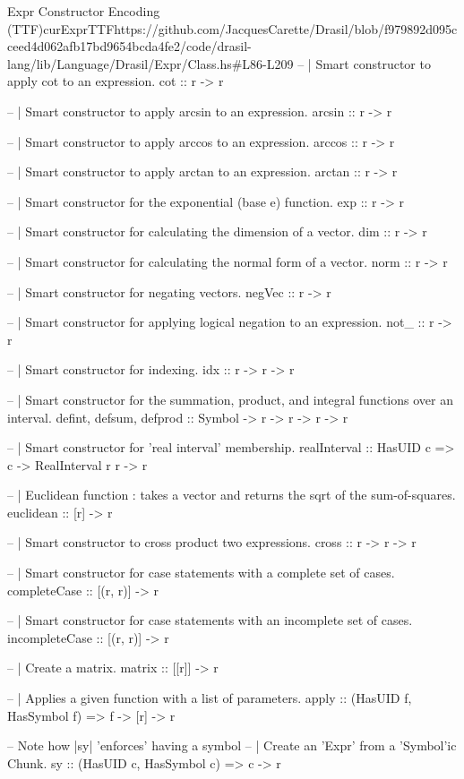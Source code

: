 \begin{haskell}{Expr Constructor Encoding (TTF)}{curExprTTF}{https://github.com/JacquesCarette/Drasil/blob/f979892d095cceed4d062afb17bd9654bcda4fe2/code/drasil-lang/lib/Language/Drasil/Expr/Class.hs\#L86-L209}
  -- | Smart constructor to apply cot to an expression.
  cot :: r -> r 
  
  -- | Smart constructor to apply arcsin to an expression.
  arcsin :: r -> r 
  
  -- | Smart constructor to apply arccos to an expression.
  arccos :: r -> r 
  
  -- | Smart constructor to apply arctan to an expression.
  arctan :: r -> r 
  
  -- | Smart constructor for the exponential (base e) function.
  exp :: r -> r
  
  -- | Smart constructor for calculating the dimension of a vector.
  dim :: r -> r
  
  -- | Smart constructor for calculating the normal form of a vector.
  norm :: r -> r
  
  -- | Smart constructor for negating vectors.
  negVec :: r -> r
  
  -- | Smart constructor for applying logical negation to an expression.
  not_ :: r -> r
  
  -- | Smart constructor for indexing.
  idx :: r -> r -> r
  
  -- | Smart constructor for the summation, product, and integral functions over an interval.
  defint, defsum, defprod :: Symbol -> r -> r -> r -> r
  
  -- | Smart constructor for 'real interval' membership.
  realInterval :: HasUID c => c -> RealInterval r r -> r
  
  -- | Euclidean function : takes a vector and returns the sqrt of the sum-of-squares.
  euclidean :: [r] -> r
  
  -- | Smart constructor to cross product two expressions.
  cross :: r -> r -> r
  
  -- | Smart constructor for case statements with a complete set of cases.
  completeCase :: [(r, r)] -> r
  
  -- | Smart constructor for case statements with an incomplete set of cases.
  incompleteCase :: [(r, r)] -> r
  
  -- | Create a matrix.
  matrix :: [[r]] -> r


  -- | Applies a given function with a list of parameters.
  apply :: (HasUID f, HasSymbol f) => f -> [r] -> r
   
  -- Note how |sy| 'enforces' having a symbol
  -- | Create an 'Expr' from a 'Symbol'ic Chunk.
  sy :: (HasUID c, HasSymbol c) => c -> r
\end{haskell}
